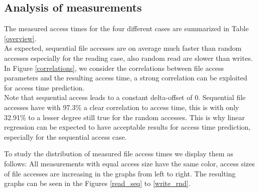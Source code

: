 \documentclass{superfri}
\begin{document}
\subsection{Analysis of measurements}
\label{sec:measurements}
The measured access times for the four different cases are summarized in Table\,\ref{overview}.
\\
As expected, sequential file accesses are on average much faster than random accesses especially for the reading case, also random read are slower than writes.\\
In Figure \ref{correlations}, we consider the correlations between file access parameters and the resulting access time, a strong correlation can be exploited for access time prediction.
\\
Note that sequential access leads to a constant delta-offset of $0$.
Sequential file accesses have with 97.3\% a clear correlation to access time, this is with only 32.91\% to a lesser degree still true for the random accesses.
This is why linear regression can be expected to have acceptable results for access time prediction, especially for the sequential access case.


\medskip

To study the distribution of measured file access times we display them as follows:
All measurements with equal access size have the same color, access sizes of file accesses are increasing in the graphs from left to right.
The resulting graphs can be seen in the Figures \ref{read_seq} to \ref{write_rnd}.
\end{document}
